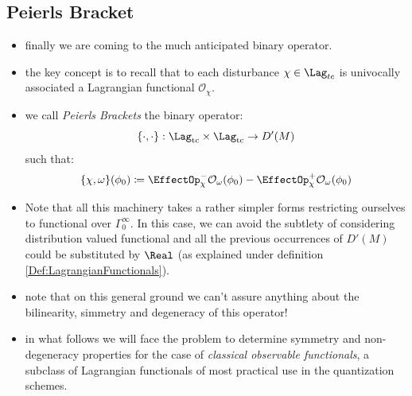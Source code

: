 \documentclass[a4paper,11pt]{scrartcl}
\begin{document}
    \subsection{Peierls Bracket}
    \begin{itemize}
        \item finally we are coming to the much anticipated binary operator.
        \item the key concept is to recall that to each disturbance $\chi \in \Lag_{tc} $ is univocally associated a Lagrangian functional $\mathcal{O}_\chi$.
        \item we call \emph{Peierls Brackets} the binary operator:
        $$ \{\cdot,\cdot\}:\Lag_{\textrm{tc}} \times \Lag_{\textrm{tc}} \rightarrow D'(M) $$
        such that:
        $$
                \{\chi, \omega \}(\phi_0) \coloneqq \EffectOp_\chi^- \mathcal{O}_\omega (\phi_0) - \EffectOp_\chi^+ \mathcal{O}_\omega(\phi_0)
        $$
        \item Note that all this machinery takes a rather simpler forms restricting ourselves to functional over $\Gamma_0^\infty$. 
        In this case, we can avoid the subtlety of considering distribution valued functional and all the previous occurrences of $D'(M)$ could be substituted by $\Real$ (as explained under definition \ref{Def:LagrangianFunctionals}).
        \item note that on this general ground we can't  assure anything about the bilinearity, simmetry and degeneracy of this operator!
        \item in what follows we will face the problem to determine  symmetry and non-degeneracy properties for the case of  \emph{classical observable functionals}, a subclass of Lagrangian functionals of most practical use in the quantization schemes.        
    \end{itemize}
\end{document}
